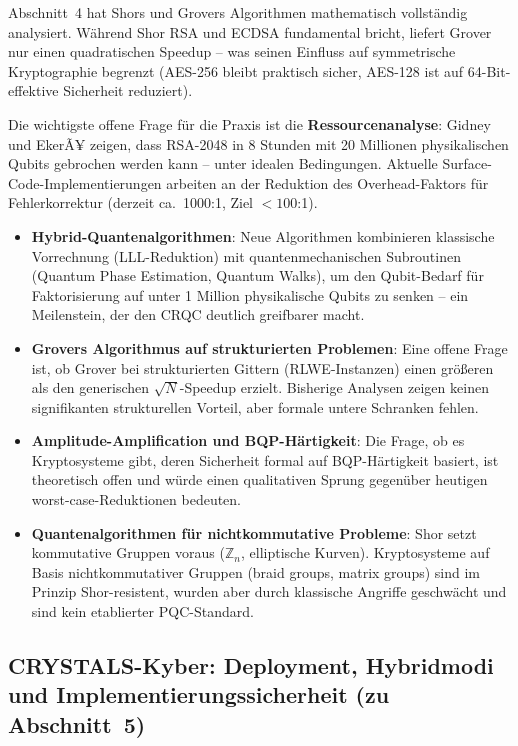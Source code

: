 ﻿\documentclass[a4paper,12pt]{article}
\theoremstyle{definition}
\begin{document}
Abschnitt~4 hat Shors und Grovers Algorithmen mathematisch vollständig
analysiert. Während Shor RSA und ECDSA fundamental bricht, liefert
Grover nur einen quadratischen Speedup -- was seinen Einfluss auf
symmetrische Kryptographie begrenzt (AES-256 bleibt praktisch sicher,
AES-128 ist auf 64-Bit-effektive Sicherheit reduziert).

Die wichtigste offene Frage für die Praxis ist die
\textbf{Ressourcenanalyse}: Gidney und EkerÃ¥ \cite{GE21} zeigen, dass
RSA-2048 in 8 Stunden mit 20 Millionen physikalischen Qubits gebrochen
werden kann -- unter idealen Bedingungen. Aktuelle
Surface-Code-Implementierungen \cite{FC09} arbeiten an der Reduktion
des Overhead-Faktors für Fehlerkorrektur (derzeit ca.\ 1000:1, Ziel
$<100$:1).

\begin{itemize}
  \item \textbf{Hybrid-Quantenalgorithmen}: Neue Algorithmen kombinieren
    klassische Vorrechnung (LLL-Reduktion) mit quantenmechanischen
    Subroutinen (Quantum Phase Estimation, Quantum Walks), um den
    Qubit-Bedarf für Faktorisierung auf unter 1 Million physikalische
    Qubits zu senken -- ein Meilenstein, der den CRQC deutlich
    greifbarer macht.
  \item \textbf{Grovers Algorithmus auf strukturierten Problemen}:
    Eine offene Frage ist, ob Grover bei strukturierten Gittern
    (RLWE-Instanzen) einen größeren als den generischen $\sqrt{N}$-Speedup
    erzielt. Bisherige Analysen zeigen keinen signifikanten
    strukturellen Vorteil, aber formale untere Schranken fehlen.
  \item \textbf{Amplitude-Amplification und BQP-Härtigkeit}:
    Die Frage, ob es Kryptosysteme gibt, deren Sicherheit formal
    auf BQP-Härtigkeit basiert, ist theoretisch offen und würde
    einen qualitativen Sprung gegenüber heutigen worst-case-Reduktionen
    bedeuten.
  \item \textbf{Quantenalgorithmen für nichtkommutative Probleme}:
    Shor setzt kommutative Gruppen voraus ($\mathbb{Z}_n$, elliptische
    Kurven). Kryptosysteme auf Basis nichtkommutativer Gruppen
    (braid groups, matrix groups) sind im Prinzip Shor-resistent,
    wurden aber durch klassische Angriffe geschwächt und sind kein
    etablierter PQC-Standard.
\end{itemize}

\subsection{CRYSTALS-Kyber: Deployment, Hybridmodi und Implementierungssicherheit (zu Abschnitt~5)}
\end{document}
